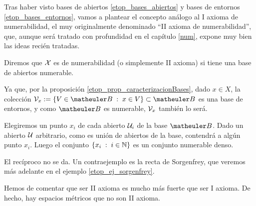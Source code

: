 Tras haber visto bases de abiertos \ref{etop_bases_abiertos} y bases de entornos \ref{etop_bases_entornos}, vamos a plantear el concepto análogo al I axioma de numerabilidad, el muy originalmente denominado ``II axioma de numerabilidad'', que, aunque será tratado con profundidad en el capítulo \ref{num}, expone muy bien las ideas recién tratadas.
 
\begin{defi}
	\label{etop_2_axioma_num}
	Diremos que $\mathcal{X}$ es  de numerabilidad (o simplemente II axioma) si tiene una base de abiertos numerable.

\end{defi}
\begin{obs}
	\label{etop_2_axioma_sep}
	Ya que, por la proposición \ref{etop_prop_caracterizacionBases}, dado $x\in X$, la colección $\V_x:=\{V\in\B\midc x\in V\}\subset\B$ es una base de entornos, y como $\B$ es numerable, $\mathcal{V}_x$ también lo será.
\end{obs}

\begin{obs}
	Elegiremos un punto $x_i$ de cada abierto $\mathcal{U}_i$ de la base $\B$. Dado un abierto $\mathcal{U}$ arbitrario, como es unión de abiertos de la base, contendrá a algún punto $x_i$. Luego el conjunto $\{x_i\;:\; i\in\mathbb{N}\}$ es un conjunto numerable denso.
	
	El recíproco no se da. Un contraejemplo es la recta de Sorgenfrey, que veremos más adelante en el ejemplo \ref{etop_ej_sorgenfrey}.
\end{obs}

Hemos de comentar que ser II axioma es mucho más fuerte que ser I axioma. De hecho, hay espacios métricos que no son II axioma.

